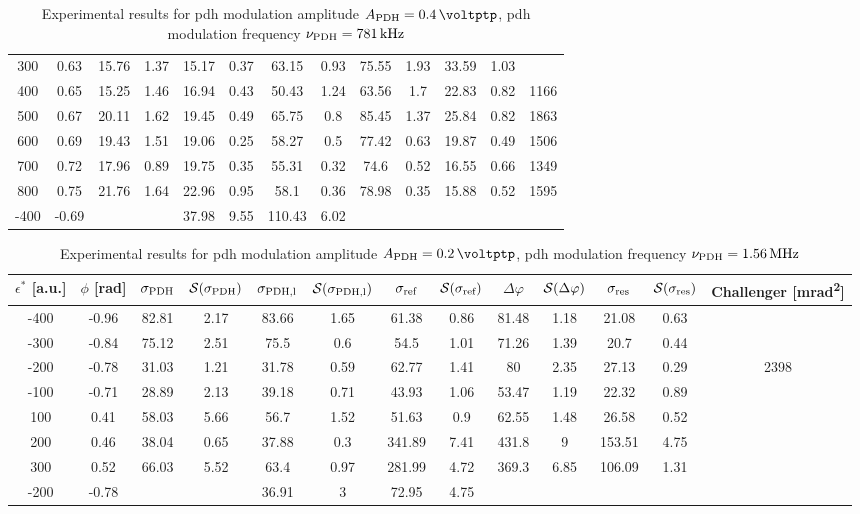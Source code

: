 \begin{landscape}
\begin{table}
\begin{tabular}{|c|c|c|c|c|c|c|c|c|c|c|c|c|}
		300 & 0.63 & 15.76 & 1.37 & 15.17 & 0.37 & 63.15 & 0.93 & 75.55 & 1.93 & 33.59 & 1.03 & \\
		400 & 0.65 & 15.25 & 1.46 & 16.94 & 0.43 & 50.43 & 1.24 & 63.56 & 1.7 & 22.83 & 0.82 & 1166\\
		500 & 0.67 & 20.11 & 1.62 & 19.45 & 0.49 & 65.75 & 0.8 & 85.45 & 1.37 & 25.84 & 0.82 & 1863\\
		600 & 0.69 & 19.43 & 1.51 & 19.06 & 0.25 & 58.27 & 0.5 & 77.42 & 0.63 & 19.87 & 0.49 & 1506\\
		700 & 0.72 & 17.96 & 0.89 & 19.75 & 0.35 & 55.31 & 0.32 & 74.6 & 0.52 & 16.55 & 0.66 & 1349\\
		800 & 0.75 & 21.76 & 1.64 & 22.96 & 0.95 & 58.1 & 0.36 & 78.98 & 0.35 & 15.88 & 0.52 & 1595\\
		\hline
		\hline
		-400 & -0.69 & & & 37.98 & 9.55 & 110.43 & 6.02 & & & & & \\
		\hline
	\end{tabular}
	\caption{Experimental results for \gls{pdh} modulation amplitude $\tind{A}{PDH} = \SI{0.4}{\voltptp}$, \gls{pdh} modulation frequency $\nu_{\text{PDH}} = \SI{781}{\kilo\hertz}$}
	\end{table}
	
	
	\begin{table}
	\centering
	\begin{tabular}{|c|c|c|c|c|c|c|c|c|c|c|c|c|}
		\hline
		$\epsilon^*$ [a.u.] & $\phi$ [\si{\radian}] & $\sigma_{\text{PDH}}$ & $\mathcal{S}(\sigma_{\text{PDH}})$ & $\sigma_{\text{PDH,l}}$ & $\mathcal{S}(\sigma_{\text{PDH,l}})$  & $\sigma_{\text{ref}}$ & $\mathcal{S}(\sigma_{\text{ref}})$ & $\Delta \varphi$ & $\mathcal{S}(\Delta \varphi)$ & $\sigma_{\text{res}}$  & $\mathcal{S}(\sigma_{\text{res}})$ & Challenger [\si{\milli\radian\squared}] \\
		\hline
		\hline
		-400 & -0.96 & 82.81 & 2.17 & 83.66 & 1.65 & 61.38 & 0.86 & 81.48 & 1.18 & 21.08 & 0.63 & \\
		-300 & -0.84 & 75.12 & 2.51 & 75.5 & 0.6 & 54.5 & 1.01 & 71.26 & 1.39 & 20.7 & 0.44 & \\
		-200 & -0.78 & 31.03 & 1.21 & 31.78 & 0.59 & 62.77 & 1.41 & 80 & 2.35 & 27.13 & 0.29 & 2398\\
		-100 & -0.71 & 28.89 & 2.13 & 39.18 & 0.71 & 43.93 & 1.06 & 53.47 & 1.19 & 22.32 & 0.89 & \\
		100 & 0.41 & 58.03 & 5.66 & 56.7 & 1.52 & 51.63 & 0.9 & 62.55 & 1.48 & 26.58 & 0.52 & \\
		200 & 0.46 & 38.04 & 0.65 & 37.88 & 0.3 & 341.89 & 7.41 & 431.8 & 9 & 153.51 & 4.75 & \\
		300 & 0.52 & 66.03 & 5.52 & 63.4 & 0.97 & 281.99 & 4.72 & 369.3 & 6.85 & 106.09 & 1.31 & \\
		\hline
		\hline
		-200 & -0.78 & & & 36.91 & 3 & 72.95 & 4.75 & & & & & \\
		\hline
	\end{tabular}
	\caption{Experimental results for \gls{pdh} modulation amplitude $\tind{A}{PDH} = \SI{0.2}{\voltptp}$, \gls{pdh} modulation frequency $\nu_{\text{PDH}} = \SI{1.56}{\mega\hertz}$}
	\end{table}
	

\end{landscape}
